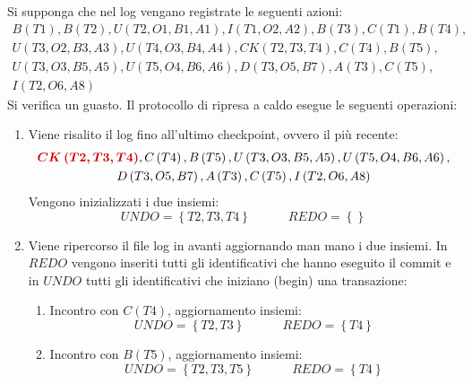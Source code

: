\documentclass[a4paper]{article}
\begin{document}
	Si supponga che nel log vengano registrate le seguenti azioni:
	\begin{gather*}
		B\left(T1\right), B\left(T2\right), U\left(T2,O1,B1,A1\right), I\left(T1,O2,A2\right), B\left(T3\right), C\left(T1\right), B\left(T4\right), \\
		U\left(T3, O2, B3, A3\right), U\left(T4, O3, B4, A4\right), CK\left(T2, T3, T4\right), C\left(T4\right), B\left(T5\right), \\
		U\left(T3,O3,B5,A5\right), U\left(T5,O4,B6,A6\right), D\left(T3,O5,B7\right), A\left(T3\right), C\left(T5\right), \\
		I\left(T2, O6, A8\right)
	\end{gather*}
	Si verifica un guasto. Il protocollo di ripresa a caldo esegue le seguenti operazioni:
	\begin{enumerate}[label=\Roman*.]
		\item Viene risalito il log fino all'ultimo checkpoint, ovvero il più recente:
		\begin{gather*}
			\textcolor{Red3}{\boldsymbol{CK\left(T2, T3, T4\right)}}, C\left(T4\right), B\left(T5\right), U\left(T3,O3,B5,A5\right), U\left(T5,O4,B6,A6\right), \\
			D\left(T3,O5,B7\right), A\left(T3\right), C\left(T5\right), I\left(T2, O6, A8\right)
		\end{gather*}
		Vengono inizializzati i due insiemi:
		\begin{equation*}
			UNDO = \left\{T2, T3, T4\right\} \hspace{3em} REDO = \left\{\right\}
		\end{equation*}
		
		
		\item Viene ripercorso il file log in avanti aggiornando man mano i due insiemi. In $REDO$ vengono inseriti tutti gli identificativi che hanno eseguito il \textsf{commit} e in $UNDO$ tutti gli identificativi che iniziano (\textsf{begin}) una transazione:
		\begin{enumerate}
			\item Incontro con $C\left(T4\right)$, aggiornamento insiemi:
			\begin{equation*}
				UNDO = \left\{T2, T3\right\} \hspace{3em} REDO = \left\{T4\right\}
			\end{equation*}

			\item Incontro con $B\left(T5\right)$, aggiornamento insiemi:
			\begin{equation*}
				UNDO = \left\{T2, T3, T5\right\} \hspace{3em} REDO = \left\{T4\right\}
			\end{equation*}


\end{enumerate}
\end{enumerate}
\end{document}
